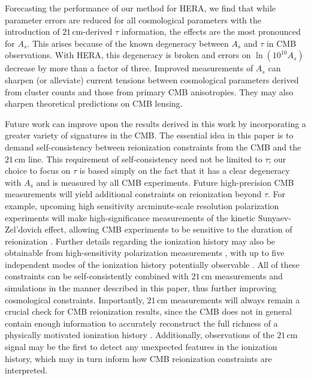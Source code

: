 \documentclass[twocolumn,aps,prd,nofootinbib,showpacs]{revtex4-1}
\begin{document}
Forecasting the performance of our method for HERA, we find that while parameter errors are reduced for all cosmological parameters with the introduction of $21\,\textrm{cm}$-derived $\tau$ information, the effects are the most pronounced for $A_s$. This arises because of the known degeneracy between $A_s$ and $\tau$ in CMB observations. With HERA, this degeneracy is broken and errors on $\ln (10^{10} A_s)$ decrease by more than a factor of three. Improved measurements of $A_s$ can sharpen (or alleviate) current tensions between cosmological parameters derived from cluster counts and those from primary CMB anisotropies. They may also sharpen theoretical predictions on CMB lensing.

Future work can improve upon the results derived in this work by incorporating a greater variety of signatures in the CMB. The essential idea in this paper is to demand self-consistency between reionization constraints from the CMB and the $21\,\textrm{cm}$ line. This requirement of self-consistency need not be limited to $\tau$; our choice to focus on $\tau$ is based simply on the fact that it has a clear degeneracy with $A_s$ and is measured by all CMB experiments. Future high-precision CMB measurements will yield additional constraints on reionization beyond $\tau$. For example, upcoming high sensitivity arcminute-scale resolution polarization experiments will make high-significance measurements of the kinetic Sunyaev-Zel'dovich effect, allowing CMB experiments to be sensitive to the duration of reionization \cite{calabrese_et_al2014}. Further details regarding the ionization history may also be obtainable from high-sensitivity polarization measurements \cite{hu_and_holder2003,dai_et_al2015}, with up to five independent modes of the ionization history potentially observable \cite{mortonson_and_hu2008}. All of these constraints can be self-consistently combined with $21\,\textrm{cm}$ measurements and simulations in the manner described in this paper, thus further improving cosmological constraints. Importantly, $21\,\textrm{cm}$ measurements will always remain a crucial check for CMB reionization results, since the CMB does not in general contain enough information to accurately reconstruct the full richness of a physically motivated ionization history \cite{MoradinezhadDizgah_et_al2013}. Additionally, observations of the $21\,\textrm{cm}$ signal may be the first to detect any unexpected features in the ionization history, which may in turn inform how CMB reionization constraints are interpreted.
\end{document}
